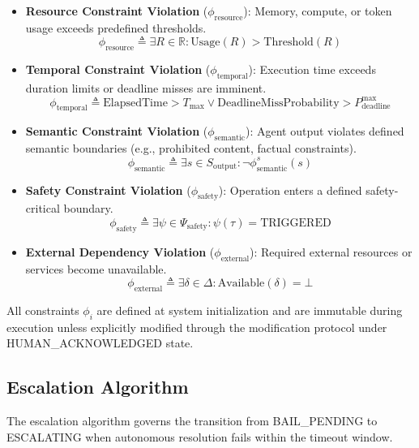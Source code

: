 \begin{itemize}
\item \textbf{Resource Constraint Violation} ($\phi_{\text{resource}}$): Memory, compute, or token usage exceeds predefined thresholds.
\[
\phi_{\text{resource}} \triangleq \exists R \in \mathbb{R}: \text{Usage}(R) > \text{Threshold}(R)
\]

\item \textbf{Temporal Constraint Violation} ($\phi_{\text{temporal}}$): Execution time exceeds duration limits or deadline misses are imminent.
\[
\phi_{\text{temporal}} \triangleq \text{ElapsedTime} > T_{\text{max}} \lor \text{DeadlineMissProbability} > P_{\text{deadline}}^{\max}
\]

\item \textbf{Semantic Constraint Violation} ($\phi_{\text{semantic}}$): Agent output violates defined semantic boundaries (e.g., prohibited content, factual constraints).
\[
\phi_{\text{semantic}} \triangleq \exists s \in S_{\text{output}}: \neg\phi_{\text{semantic}}^s(s)
\]

\item \textbf{Safety Constraint Violation} ($\phi_{\text{safety}}$): Operation enters a defined safety-critical boundary.
\[
\phi_{\text{safety}} \triangleq \exists \psi \in \Psi_{\text{safety}}: \psi(\tau) = \text{TRIGGERED}
\]

\item \textbf{External Dependency Violation} ($\phi_{\text{external}}$): Required external resources or services become unavailable.
\[
\phi_{\text{external}} \triangleq \exists \delta \in \Delta: \text{Available}(\delta) = \bot
\]
\end{itemize}

All constraints $\phi_i$ are defined at system initialization and are immutable during execution unless explicitly modified through the modification protocol under HUMAN\_ACKNOWLEDGED state.

\subsection{Escalation Algorithm}

The escalation algorithm governs the transition from BAIL\_PENDING to ESCALATING when autonomous resolution fails within the timeout window.

